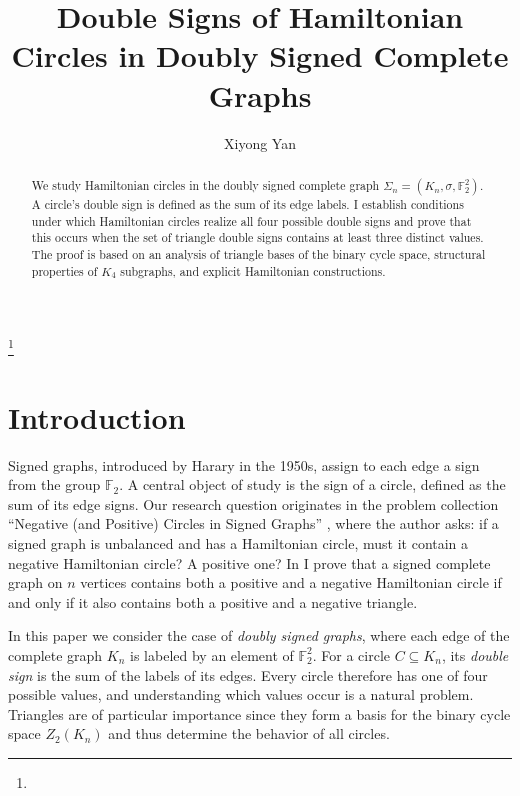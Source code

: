 \documentclass[12pt]{amsart}
\theoremstyle{plain}
\theoremstyle{definition}%
\begin{document}
\title[Double Signs of Hamiltonian Circles  in Doubly Signed Complete Graphs]{Double Signs of Hamiltonian Circles  in Doubly Signed Complete Graphs}\footnote{}

\author{Xiyong Yan}
\address{89 Park Ave,  Binghamton, NY,  USA,  13903.}
\begin{abstract}
    We study Hamiltonian circles in the doubly signed complete graph 
\(\Sigma_n = (K_n, \sigma, \mathbb{F}_2^2)\). A circle’s double sign is defined as the sum of its edge labels. I establish conditions under which Hamiltonian circles realize all four possible double signs and prove that this occurs  when the set of triangle double signs contains at least three distinct values. The proof is based on an analysis of triangle bases of the binary cycle space, structural properties of 
$K_4$ subgraphs, and explicit Hamiltonian constructions. 
\end{abstract}





\maketitle
\section{Introduction}

Signed graphs, introduced by Harary in the 1950s, assign to each edge a sign from the group $\mathbb{F}_2$. A central object of study is the sign of a circle, defined as the sum of its edge signs. Our research question originates in the problem collection “Negative (and Positive) Circles in Signed Graphs” \cite{1}, where the author asks: if a signed graph is unbalanced and has a Hamiltonian circle, must it contain a negative Hamiltonian circle? A positive one? In \cite{2} I prove that a signed complete graph on $n$ vertices contains both a positive and a negative Hamiltonian circle if and only if it also contains both a positive and a negative triangle.



In this paper we consider the case of \emph{doubly signed graphs}, where each edge of the complete graph $K_n$ is labeled by an element of  $\mathbb{F}_2^2$. For a circle $C \subseteq K_n$, its \emph{double sign} is the sum of the labels of its edges. Every circle therefore has one of four possible values, and understanding which values occur is a natural problem. Triangles are of particular importance since they form a basis for the binary cycle space $Z_2(K_n)$ and thus determine the behavior of all circles.
\end{document}
